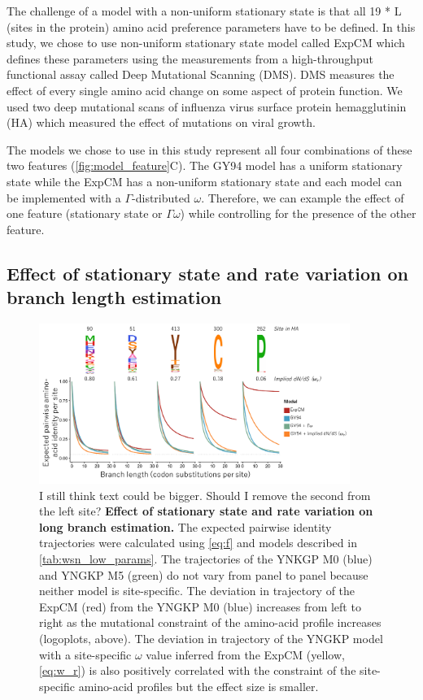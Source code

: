 \documentclass[11pt]{article}
\newcommand\skhcomment[1]{{\color{cyan}#1}}
\newcommand\jdbcomment[1]{{\color{red}#1}}
\begin{document}
The challenge of a model with a non-uniform stationary state is that all 19 * L (sites in the protein) amino acid preference parameters have to be defined. 
In this study, we chose to use non-uniform stationary state model called ExpCM which defines these parameters using the measurements from a high-throughput functional assay called Deep Mutational Scanning (DMS). 
DMS measures the effect of every single amino acid change on some aspect of protein function. 
We used two deep mutational scans of influenza virus surface protein hemagglutinin (HA) which measured the effect of mutations on viral growth. 

The models we chose to use in this study represent all four combinations of these two features (\ref{fig:model_feature}C). 
The GY94 model has a uniform stationary state while the ExpCM has a non-uniform stationary state and each model can be implemented with a $\Gamma$-distributed $\omega$. 
Therefore, we can example the effect of one feature (stationary state or $\Gamma\omega$) while controlling for the presence of the other feature. 

\subsection*{Effect of stationary state and rate variation on branch length estimation}

\begin{figure}[H]
\centerline{\includegraphics[width=0.90\textwidth]{figures/decay.pdf}}
\caption{\label{fig:decay}
\jdbcomment{I still think text could be bigger.}
\skhcomment{Should I remove the second from the left site?}
\textbf{Effect of stationary state and rate variation on long branch estimation.}
The expected pairwise identity trajectories were calculated using \ref{eq:f} and models described in \ref{tab:wsn_low_params}.
The trajectories of the YNKGP M0 (blue) and YNGKP M5 (green) do not vary from panel to panel because neither model is site-specific. 
The deviation in trajectory of the ExpCM (red) from the YNGKP M0 (blue) increases from left to right as the mutational constraint of the amino-acid profile increases (logoplots, above). 
The deviation in trajectory of the YNGKP model with a site-specific $\omega$ value inferred from the ExpCM (yellow, \ref{eq:w_r}) is also positively correlated with the constraint of the site-specific amino-acid profiles but the effect size is smaller. 
}
\end{figure}
\end{document}
